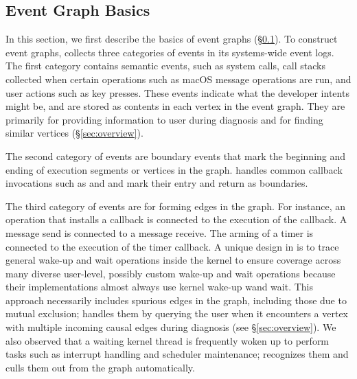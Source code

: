 \subsection{Event Graph Basics}\label{subsec:eventgraph}

In this section, we first describe the basics of \xxx event graphs
(\S\ref{subsec:eventgraph}). 
To construct event graphs, \xxx collects three categories of events in its
systems-wide event logs.  The first category contains semantic events,
such as system calls, call stacks collected when certain operations such
as macOS message operations are run, and user actions such as key presses.
These events indicate what the developer intents might be, and are stored
as contents in each vertex in the event graph.  They are primarily for
providing information to user during diagnosis and for finding similar
vertices (\S\ref{sec:overview}).

The second category of events are boundary events that mark the beginning
and ending of execution segments or vertices in the graph.  \xxx handles
common callback invocations such as  and
 and mark their entry and return as boundaries.

The third category of events are for forming edges in the graph.  For
instance, an operation that installs a callback is connected to the
execution of the callback.  A message send is connected to a message
receive.  The arming of a timer is connected to the execution of the timer
callback.  A unique design in \xxx is to trace general wake-up and wait
operations inside the kernel to ensure coverage across many diverse
user-level, possibly custom wake-up and wait operations because their
implementations almost always use kernel wake-up wand wait.  This approach
necessarily includes spurious edges in the graph, including those due to
mutual exclusion; \xxx handles them by querying the user when it
encounters a vertex with multiple incoming causal edges during diagnosis
(see \S\ref{sec:overview}).  We also observed that a waiting kernel thread
is frequently woken up to perform tasks such as interrupt handling and
scheduler maintenance; \xxx recognizes them and culls them out from the
graph automatically.


